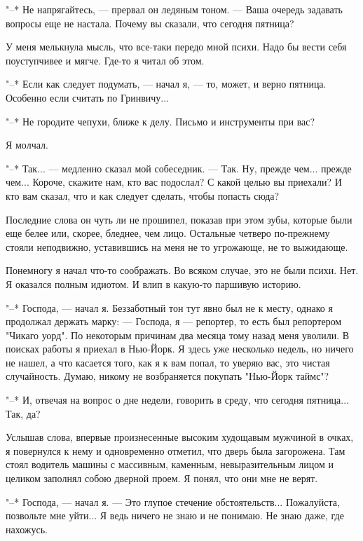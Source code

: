 "--* Не напрягайтесь, --- прервал он ледяным тоном. --- Ваша очередь  задавать
вопросы еще не настала. Почему вы сказали, что сегодня пятница?

У меня мелькнула мысль, что все-таки передо мной психи. Надо  бы  вести
себя поуступчивее и мягче. Где-то я читал об этом.

"--* Если как следует подумать, --- начал я, --- то, может, и  верно  пятница.
Особенно если считать по Гринвичу...

"--* Не городите чепухи, ближе к делу. Письмо и инструменты при вас?

Я молчал.

"--* Так... --- медленно сказал мой собеседник. ---  Так.  Ну,  прежде  чем...
прежде чем... Короче, скажите нам, кто вас  подослал?  С  какой  целью  вы
приехали? И кто вам сказал, что и как следует сделать, чтобы попасть сюда?

Последние слова он чуть ли не прошипел, показав при этом зубы,  которые
были  еще  белее  или,  скорее,  бледнее,  чем  лицо.  Остальные   четверо
по-прежнему стояли неподвижно, уставившись на меня не то угрожающе, не  то
выжидающе.

Понемногу я начал что-то соображать. Во  всяком  случае,  это  не  были
психи. Нет. Я оказался полным идиотом. И влип в какую-то паршивую историю.

"--* Господа, --- начал я. Беззаботный тон тут явно был не к месту, однако я
продолжал держать марку: --- Господа, я --- репортер, то есть  был  репортером
"Чикаго уорд". По некоторым причинам два месяца тому назад меня уволили. В
поисках работы я приехал в Нью-Йорк. Я  здесь  уже  несколько  недель,  но
ничего не нашел, а что касается того, как я к вам попал,  то  уверяю  вас,
это чистая случайность. Думаю, никому не возбраняется  покупать  "Нью-Йорк
таймс"?

"--* И, отвечая на вопрос о дне недели,  говорить  в  среду,  что  сегодня
пятница... Так, да?

Услышав слова,  впервые  произнесенные  высоким  худощавым  мужчиной  в
очках, я  повернулся  к  нему  и  одновременно  отметил,  что  дверь  была
загорожена.   Там   стоял   водитель   машины   с   массивным,   каменным,
невыразительным лицом и целиком заполнял собою дверной проем. Я понял, что
они мне не верят.

"--*  Господа,  ---  начал  я.  ---  Это  глупое   стечение   обстоятельств...
Пожалуйста, позвольте мне уйти... Я ведь ничего не знаю и не  понимаю.  Не
знаю даже, где нахожусь.

